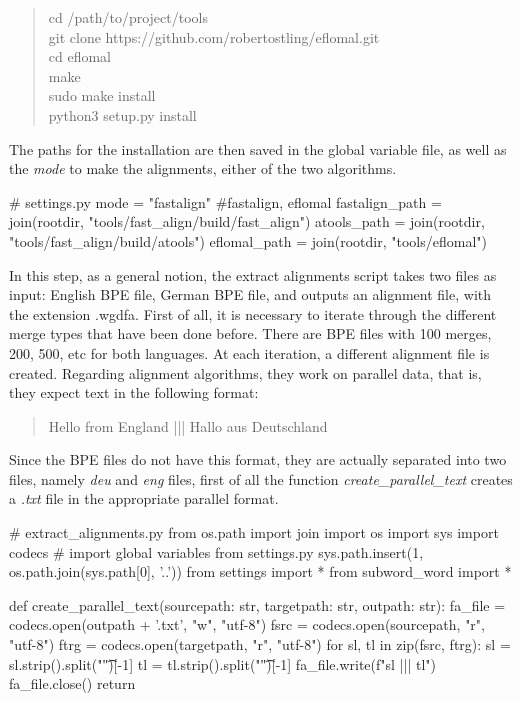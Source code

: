 \begin{quote}
  cd /path/to/project/tools\\
  git clone https://github.com/robertostling/eflomal.git\\
  cd eflomal\\
  make\\
  sudo make install\\
  python3 setup.py install
\end{quote}

The paths for the installation are then saved in the global variable file, as well as the \emph{mode} to make the alignments, either of the two algorithms.

\begin{python}
# settings.py
mode = "fastalign" #fastalign, eflomal
fastalign_path = join(rootdir, "tools/fast_align/build/fast_align")
atools_path = join(rootdir, "tools/fast_align/build/atools")
eflomal_path = join(rootdir, "tools/eflomal")
\end{python}

In this step, as a general notion, the extract alignments script takes two files as input: English BPE file, German BPE file, and outputs an alignment file, with the extension .wgdfa. First of all, it is necessary to iterate through the different merge types that have been done before. There are BPE files with 100 merges, 200, 500, etc for both languages. At each iteration, a different alignment file is created. Regarding alignment algorithms, they work on parallel data, that is, they expect text in the following format:

\begin{quote}
  Hello from England ||| Hallo aus Deutschland
\end{quote}

Since the BPE files do not have this format, they are actually separated into two files, namely \emph{deu} and \emph{eng} files, first of all the function \emph{create\_parallel\_text} creates a \emph{.txt} file in the appropriate parallel format.

\begin{python}
# extract_alignments.py
from os.path import join
import os
import sys
import codecs
# import global variables from settings.py
sys.path.insert(1, os.path.join(sys.path[0], '..'))
from settings import *
from subword_word import *

def create_parallel_text(sourcepath: str, targetpath: str, outpath: str):
  fa_file = codecs.open(outpath + '.txt', "w", "utf-8")
  fsrc = codecs.open(sourcepath, "r", "utf-8")
  ftrg = codecs.open(targetpath, "r", "utf-8")
  for sl, tl in zip(fsrc, ftrg):
    sl = sl.strip().split("\t")[-1]
    tl = tl.strip().split("\t")[-1]
    fa_file.write(f"{sl} ||| {tl}\n")
  fa_file.close()
  return
\end{python}

